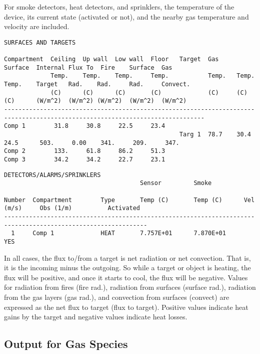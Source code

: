 For smoke detectors, heat detectors, and sprinklers, the temperature of the device, its current state (activated or not), and the nearby gas temperature and velocity are included.

\begin{lstlisting}[basicstyle=\tiny]
SURFACES AND TARGETS

Compartment  Ceiling  Up wall  Low wall  Floor   Target  Gas     Surface  Internal Flux To  Fire    Surface  Gas
             Temp.    Temp.    Temp.     Temp.           Temp.   Temp.    Temp.    Target   Rad.    Rad.     Rad.     Convect.
             (C)      (C)      (C)       (C)             (C)     (C)      (C)      (W/m^2)  (W/m^2) (W/m^2)  (W/m^2)  (W/m^2)
------------------------------------------------------------------------------------------------------------------------------
Comp 1        31.8     30.8     22.5     23.4
                                                 Targ 1  78.7    30.4     24.5      503.     0.00    341.     209.     347.
Comp 2        133.     61.8     86.2     51.3
Comp 3        34.2     34.2     22.7     23.1
\end{lstlisting}

\begin{lstlisting}[basicstyle=\tiny]
DETECTORS/ALARMS/SPRINKLERS
                                      Sensor         Smoke

Number  Compartment        Type       Temp (C)       Temp (C)      Vel (m/s)     Obs (1/m)          Activated
--------------------------------------------------------------------------------------------------------------
  1     Comp 1             HEAT       7.757E+01      7.870E+01                                      YES
\end{lstlisting}
In all cases, the flux to/from a target is net radiation or net convection. That is, it is the incoming minus the outgoing. So while a target or object is heating, the flux will be positive, and once it starts to cool, the flux will be negative. Values for radiation from fires (fire rad.), radiation from surfaces (surface rad.), radiation from the gas layers (gas rad.), and convection from surfaces (convect) are expressed as the net flux to target (flux to target). Positive values indicate heat gains by the target and negative values indicate heat losses.


\subsection{Output for Gas Species}

